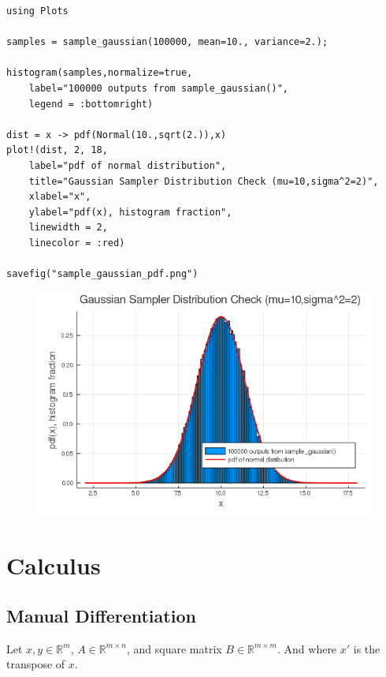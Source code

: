 \documentclass[12pt,letter]{article}
\begin{document}
\begin{enumerate}
\begin{verbatim}
using Plots

samples = sample_gaussian(100000, mean=10., variance=2.);

histogram(samples,normalize=true, 
    label="100000 outputs from sample_gaussian()",
    legend = :bottomright)
    
dist = x -> pdf(Normal(10.,sqrt(2.)),x)
plot!(dist, 2, 18, 
    label="pdf of normal distribution",
    title="Gaussian Sampler Distribution Check (mu=10,sigma^2=2)",
    xlabel="x",
    ylabel="pdf(x), histogram fraction",
    linewidth = 2,
    linecolor = :red)

savefig("sample_gaussian_pdf.png")
\end{verbatim}
\begin{figure}[h]
  \centering
  \includegraphics[width=14cm,keepaspectratio]{imgs/sample_gaussian_pdf.png}
\end{figure}
\end{enumerate}

\pagebreak

\section{Calculus}

\subsection{Manual Differentiation}

Let $x,y \in \mathbb{R}^m$, $A \in \mathbb{R}^{m \times n}$, and square matrix $B \in \mathbb{R}^{m \times m}$. And where $x'$ is the transpose of $x$.
\end{document}
